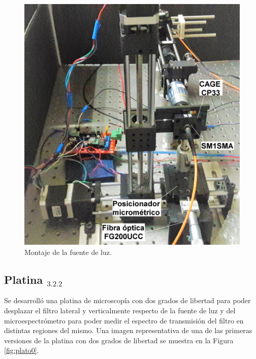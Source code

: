 \begin{figure}[H]
	\centering
	\includegraphics[scale=0.13]{Figs/microespectrometro/setupactualdecote_retoc_condetalles.jpg}
	\caption{Montaje de la fuente de luz.}
	\label{fig:montttluz}
\end{figure}


 


\singlespacing
\subsection{Platina \href{https://github.com/jrr1984/open\_frame\_XYStage}{\faGithub$_{3.2.2}$} \href{https://github.com/jrr1984/open\_frame\_XYStage/tree/master/3dprintedparts/STLs}{\faCubes}}
\label{sec:platina}

\hspace{0.5cm}Se desarrolló una platina de microscopía con dos grados de libertad para poder desplazar el filtro lateral y verticalmente respecto de la fuente de luz y del microespectrómetro para poder medir el espectro de transmisión del filtro en distintas regiones del mismo. Una imagen representativa de una de las primeras versiones de la platina con dos grados de libertad se muestra en la Figura \ref{fig:plato0}.


